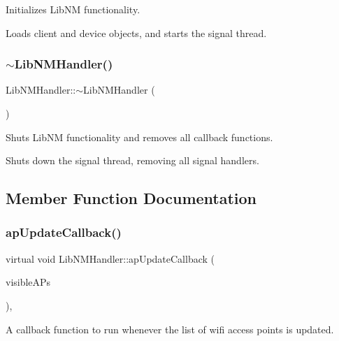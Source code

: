 Initializes Lib\+NM functionality.

Loads client and device objects, and starts the signal thread. \mbox{\label{classLibNMHandler_a88cedcde563ac8cce44c0cf50f86f042}} 
\subsubsection{\texorpdfstring{$\sim$\+Lib\+N\+M\+Handler()}{~LibNMHandler()}}
{\footnotesize\ttfamily Lib\+N\+M\+Handler\+::$\sim$\+Lib\+N\+M\+Handler (\begin{DoxyParamCaption}{ }\end{DoxyParamCaption})\hspace{0.3cm}{\ttfamily [virtual]}}

Shuts Lib\+NM functionality and removes all callback functions.

Shuts down the signal thread, removing all signal handlers. 

\subsection{Member Function Documentation}
\mbox{\label{classLibNMHandler_a6584162b6206786ca11dcdb1ab9a8822}} 
\subsubsection{\texorpdfstring{ap\+Update\+Callback()}{apUpdateCallback()}}
{\footnotesize\ttfamily virtual void Lib\+N\+M\+Handler\+::ap\+Update\+Callback (\begin{DoxyParamCaption}\item[{Array$<$ \mbox{\hyperlink{classWifiAccessPoint_ad18977f884076774803027efbaa131a0}{Wifi\+Access\+Point\+::\+Ptr}} $>$}]{visible\+A\+Ps }\end{DoxyParamCaption})\hspace{0.3cm}{\ttfamily [protected]}, {}}

A callback function to run whenever the list of wifi access points is updated.


